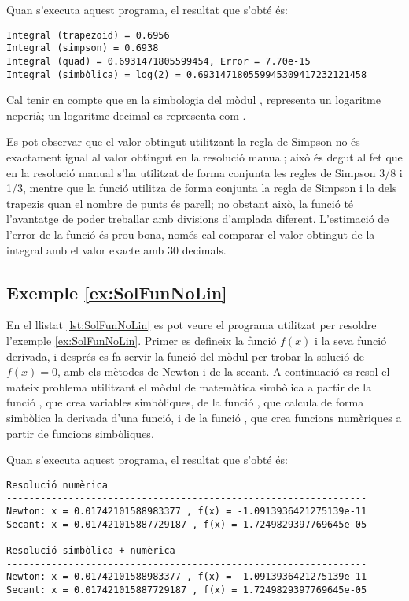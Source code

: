 Quan s'executa aquest programa, el resultat que s'obté és:
\lstset{
	language=,
	numbers=none,
	frame=none
}
\begin{lstlisting}
Integral (trapezoid) = 0.6956
Integral (simpson) = 0.6938
Integral (quad) = 0.6931471805599454, Error = 7.70e-15
Integral (simbòlica) = log(2) = 0.693147180559945309417232121458
\end{lstlisting} 

Cal tenir en compte que en la simbologia del mòdul ,  representa un logaritme neperià; un logaritme decimal es representa com .

Es pot observar que el valor obtingut utilitzant la regla de Simpson no és exactament igual al valor obtingut en la resolució manual; això és degut al fet que en la resolució manual s'ha utilitzat de forma conjunta les regles de Simpson 3/8 i 1/3, mentre que la funció   utilitza de forma conjunta la regla de Simpson i la dels trapezis quan el nombre de punts és parell; no obstant això, la funció  té l'avantatge de poder treballar amb divisions d'amplada diferent. L'estimació de l'error de la funció  és prou bona, només cal comparar el valor obtingut de la integral  amb el valor exacte amb 30 decimals.


\hypertarget{exemple:SolFunNoLin}{\subsection{Exemple \ref*{ex:SolFunNoLin} \SolFunNoLin}}
En el llistat \vref{lst:SolFunNoLin} es pot veure el programa utilitzat per resoldre l'exemple \vref{ex:SolFunNoLin}. Primer es defineix la funció $f(x)$ i la seva funció derivada, i després es fa servir la funció   del mòdul  per trobar la solució de $f(x)=0$, amb els mètodes de Newton i de la secant. A continuació es resol el mateix problema utilitzant el mòdul  de matemàtica simbòlica  a partir de la funció , que crea variables simbòliques, de la funció , que calcula de forma simbòlica la derivada d'una funció, i de la funció  , que crea funcions numèriques a partir de funcions simbòliques.




Quan s'executa aquest programa, el resultat que s'obté és:
\lstset{
	language=,
	numbers=none,
	frame=none
}
\begin{lstlisting}
Resolució numèrica
----------------------------------------------------------------
Newton: x = 0.01742101588983377 , f(x) = -1.0913936421275139e-11
Secant: x = 0.017421015887729187 , f(x) = 1.7249829397769645e-05

Resolució simbòlica + numèrica
----------------------------------------------------------------
Newton: x = 0.01742101588983377 , f(x) = -1.0913936421275139e-11
Secant: x = 0.017421015887729187 , f(x) = 1.7249829397769645e-05
\end{lstlisting} 
